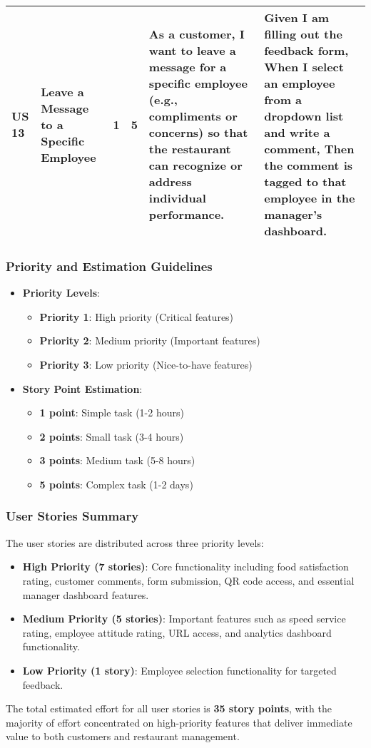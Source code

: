 \begin{table}[h]
\begin{tabular}{|p{0.8cm}|p{3.5cm}|p{0.8cm}|p{0.8cm}|p{6cm}|p{6cm}|}
\hline
US 13 & Leave a Message to a Specific Employee & 1 & 5 & As a customer, I want to leave a message for a specific employee (e.g., compliments or concerns) so that the restaurant can recognize or address individual performance. & Given I am filling out the feedback form, When I select an employee from a dropdown list and write a comment, Then the comment is tagged to that employee in the manager's dashboard. \\
\hline
\end{tabular}
\end{table}

\subsubsection{Priority and Estimation Guidelines}
\label{subsubsec:priority_estimation}

\begin{itemize}
    \item \textbf{Priority Levels}:
    \begin{itemize}
        \item \textbf{Priority 1}: High priority (Critical features)
        \item \textbf{Priority 2}: Medium priority (Important features)
        \item \textbf{Priority 3}: Low priority (Nice-to-have features)
    \end{itemize}
    \item \textbf{Story Point Estimation}:
    \begin{itemize}
        \item \textbf{1 point}: Simple task (1-2 hours)
        \item \textbf{2 points}: Small task (3-4 hours)
        \item \textbf{3 points}: Medium task (5-8 hours)
        \item \textbf{5 points}: Complex task (1-2 days)
    \end{itemize}
\end{itemize}

\subsubsection{User Stories Summary}
\label{subsubsec:user_stories_summary}

The user stories are distributed across three priority levels:
\begin{itemize}
    \item \textbf{High Priority (7 stories)}: Core functionality including food satisfaction rating, customer comments, form submission, QR code access, and essential manager dashboard features.
    \item \textbf{Medium Priority (5 stories)}: Important features such as speed service rating, employee attitude rating, URL access, and analytics dashboard functionality.
    \item \textbf{Low Priority (1 story)}: Employee selection functionality for targeted feedback.
\end{itemize}

The total estimated effort for all user stories is \textbf{35 story points}, with the majority of effort concentrated on high-priority features that deliver immediate value to both customers and restaurant management. 